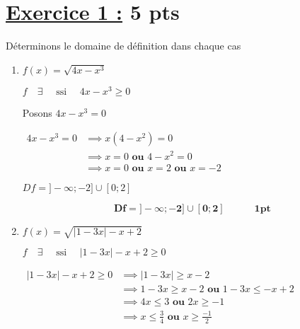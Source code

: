 \documentclass[12pt,a4paper]{article}
\begin{document}
\section*{\underline{Exercice 1 :} 5 pts }
Déterminons le domaine de définition dans chaque cas
\begin{enumerate}
    \item $f(x) = \sqrt{4x - x^3}$

\( f\quad \exists\quad  \text{ ssi } \quad 4x - x^3 \geq 0 \)

Posons \( 4x - x^3 = 0 \)

\(
\begin{aligned}
4x - x^3 = 0 &\implies x(4 - x^2) = 0\\
						 &\implies x = 0 \textbf{ ou } 4 - x^2 = 0\\
 						 &\implies	x = 0 \textbf{ ou } x = 2 \textbf{ ou } x = -2
\end{aligned}
\)  

\begin{center}
\end{center}    

\begin{center}
\( Df = ]-\infty;-2] \cup [0 ; 2 ] \) 
\end{center}   

          \begin{resultbox}
            \[
                \mathbf{Df = ]-\infty;-2] \cup [0 ; 2 ]\quad\quad\quad \textbf{1pt}}
            \]
        \end{resultbox}     
    
    \item $f(x) = \sqrt{|1 - 3x| - x + 2}$
    
    \( f\quad \exists\quad  \text{ ssi } \quad |1 - 3x| - x + 2 \geq 0 \)

\(
\begin{aligned}
|1 - 3x| - x + 2 \geq 0 &\implies |1 - 3x| \geq  x - 2\\
						 &\implies 1 - 3x \geq  x - 2 \textbf{ ou } 1 - 3x \leq  -x + 2\\
 						 &\implies	4x \leq 3 \textbf{ ou }  2x \geq  -1\\
 						 &\implies	x \leq \frac{3}{4} \textbf{ ou }  x \geq \frac{-1}{2}\\
\end{aligned}
\)  
   

\end{enumerate}
\end{document}
